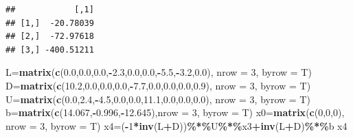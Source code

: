 \documentclass[
]{article}
\newenvironment{Shaded}{\begin{snugshade}}{\end{snugshade}}
\newcommand{\AttributeTok}[1]{\textcolor[rgb]{0.13,0.29,0.53}{#1}}
\newcommand{\DecValTok}[1]{\textcolor[rgb]{0.00,0.00,0.81}{#1}}
\newcommand{\FloatTok}[1]{\textcolor[rgb]{0.00,0.00,0.81}{#1}}
\newcommand{\FunctionTok}[1]{\textcolor[rgb]{0.13,0.29,0.53}{\textbf{#1}}}
\newcommand{\NormalTok}[1]{#1}
\newcommand{\OtherTok}[1]{\textcolor[rgb]{0.56,0.35,0.01}{#1}}
\newcommand{\SpecialCharTok}[1]{\textcolor[rgb]{0.81,0.36,0.00}{\textbf{#1}}}
\begin{document}
\begin{verbatim}
##            [,1]
## [1,]  -20.78039
## [2,]  -72.97618
## [3,] -400.51211
\end{verbatim}

\begin{Shaded}
\begin{Highlighting}[]
\NormalTok{  L}\OtherTok{=}\FunctionTok{matrix}\NormalTok{(}\FunctionTok{c}\NormalTok{(}\FloatTok{0.0}\NormalTok{,}\FloatTok{0.0}\NormalTok{,}\FloatTok{0.0}\NormalTok{,}\SpecialCharTok{{-}}\FloatTok{2.3}\NormalTok{,}\FloatTok{0.0}\NormalTok{,}\FloatTok{0.0}\NormalTok{,}\SpecialCharTok{{-}}\FloatTok{5.5}\NormalTok{,}\SpecialCharTok{{-}}\FloatTok{3.2}\NormalTok{,}\FloatTok{0.0}\NormalTok{), }\AttributeTok{nrow =} \DecValTok{3}\NormalTok{, }\AttributeTok{byrow =}\NormalTok{ T)}
\NormalTok{  D}\OtherTok{=}\FunctionTok{matrix}\NormalTok{(}\FunctionTok{c}\NormalTok{(}\FloatTok{10.2}\NormalTok{,}\FloatTok{0.0}\NormalTok{,}\FloatTok{0.0}\NormalTok{,}\FloatTok{0.0}\NormalTok{,}\SpecialCharTok{{-}}\FloatTok{7.7}\NormalTok{,}\FloatTok{0.0}\NormalTok{,}\FloatTok{0.0}\NormalTok{,}\FloatTok{0.0}\NormalTok{,}\FloatTok{0.9}\NormalTok{), }\AttributeTok{nrow =} \DecValTok{3}\NormalTok{, }\AttributeTok{byrow =}\NormalTok{ T)}
\NormalTok{  U}\OtherTok{=}\FunctionTok{matrix}\NormalTok{(}\FunctionTok{c}\NormalTok{(}\FloatTok{0.0}\NormalTok{,}\FloatTok{2.4}\NormalTok{,}\SpecialCharTok{{-}}\FloatTok{4.5}\NormalTok{,}\FloatTok{0.0}\NormalTok{,}\FloatTok{0.0}\NormalTok{,}\FloatTok{11.1}\NormalTok{,}\FloatTok{0.0}\NormalTok{,}\FloatTok{0.0}\NormalTok{,}\FloatTok{0.0}\NormalTok{), }\AttributeTok{nrow =} \DecValTok{3}\NormalTok{, }\AttributeTok{byrow =}\NormalTok{ T)}
\NormalTok{  b}\OtherTok{=}\FunctionTok{matrix}\NormalTok{(}\FunctionTok{c}\NormalTok{(}\FloatTok{14.067}\NormalTok{,}\SpecialCharTok{{-}}\FloatTok{0.996}\NormalTok{,}\SpecialCharTok{{-}}\FloatTok{12.645}\NormalTok{),}\AttributeTok{nrow =} \DecValTok{3}\NormalTok{, }\AttributeTok{byrow =}\NormalTok{ T)}
\NormalTok{  x0}\OtherTok{=}\FunctionTok{matrix}\NormalTok{(}\FunctionTok{c}\NormalTok{(}\DecValTok{0}\NormalTok{,}\DecValTok{0}\NormalTok{,}\DecValTok{0}\NormalTok{), }\AttributeTok{nrow =} \DecValTok{3}\NormalTok{, }\AttributeTok{byrow =}\NormalTok{ T)}
\NormalTok{ x4}\OtherTok{=}\NormalTok{(}\SpecialCharTok{{-}}\DecValTok{1}\SpecialCharTok{*}\FunctionTok{inv}\NormalTok{(L}\SpecialCharTok{+}\NormalTok{D))}\SpecialCharTok{\%*\%}\NormalTok{U}\SpecialCharTok{\%*\%}\NormalTok{x3}\SpecialCharTok{+}\FunctionTok{inv}\NormalTok{(L}\SpecialCharTok{+}\NormalTok{D)}\SpecialCharTok{\%*\%}\NormalTok{b}
\NormalTok{x4}
\end{Highlighting}
\end{Shaded}
\end{document}
